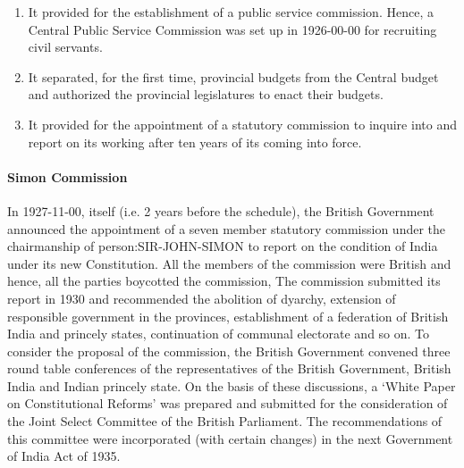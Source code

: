 \begin{enumerate}
  \item It provided for the establishment of a public service commission. Hence, a Central Public Service Commission was set up in 1926-00-00 for recruiting civil servants.
  \item It separated, for the first time, provincial budgets from the Central budget and authorized the provincial legislatures to enact their budgets.
  \item It provided for the appointment of a statutory commission to inquire into and report on its working after ten years of its coming into force.
\end{enumerate}

\paragraph{Simon Commission}

In 1927-11-00, itself (i.e. 2 years before the schedule), the British Government announced the appointment of a seven member statutory commission under the chairmanship of \gls{person:SIR-JOHN-SIMON} to report on the condition of India under its new Constitution. All the members of the commission were British and hence, all the parties boycotted the commission, The commission submitted its report in 1930 and recommended the abolition of dyarchy, extension of responsible government in the provinces, establishment of a federation of British India and princely states, continuation of communal electorate and so on. To consider the proposal of the commission, the British Government convened three round table conferences of the representatives of the British Government, British India and Indian princely state. On the basis of these discussions, a `White Paper on Constitutional Reforms' was prepared and submitted for the consideration of the Joint Select Committee of the British Parliament. The recommendations of this committee were incorporated (with certain changes) in the next Government of India Act of 1935.

